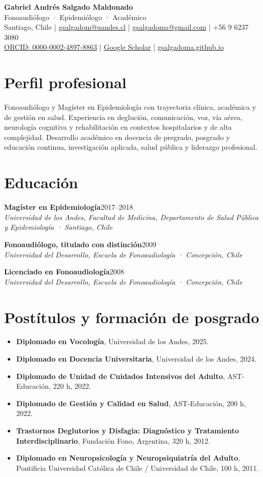 \documentclass[10pt,a4paper]{article}
\newcommand{\entry}[4]{%
\textbf{#1}\hfill {\small #2}\\
{\emph{#3}}\\[-1pt]
#4\par\vspace{4pt}}
\begin{document}
{\Huge\bfseries Gabriel Andrés Salgado Maldonado}\\[3pt]
{\large\color{textgray}Fonoaudiólogo · Epidemiólogo · Académico}\\[6pt]
Santiago, Chile \quad | \quad \href{mailto:gsalgadom@uandes.cl}{gsalgadom@uandes.cl} \quad | \quad \href{mailto:gsalgadoma@gmail.com}{gsalgadoma@gmail.com} \quad | \quad +56 9 6237 3080\\
\href{https://orcid.org/0000-0002-4897-8863}{ORCID: 0000-0002-4897-8863} \quad | \quad \href{https://scholar.google.com/citations?user=lUJ6RBoAAAAJ}{Google Scholar} \quad | \quad \href{https://gsalgadoma.github.io}{gsalgadoma.github.io}

\section*{Perfil profesional}
Fonoaudiólogo y Magíster en Epidemiología con trayectoria clínica, académica y de gestión en salud. Experiencia en deglución, comunicación, voz, vía aérea, neurología cognitiva y rehabilitación en contextos hospitalarios y de alta complejidad. Desarrollo académico en docencia de pregrado, posgrado y educación continua, investigación aplicada, salud pública y liderazgo profesional.

\section*{Educación}
\entry{Magíster en Epidemiología}{2017--2018}{Universidad de los Andes, Facultad de Medicina, Departamento de Salud Pública y Epidemiología · Santiago, Chile}{}
\entry{Fonoaudiólogo, titulado con distinción}{2009}{Universidad del Desarrollo, Escuela de Fonoaudiología · Concepción, Chile}{}
\entry{Licenciado en Fonoaudiología}{2008}{Universidad del Desarrollo, Escuela de Fonoaudiología · Concepción, Chile}{}

\section*{Postítulos y formación de posgrado}
\begin{itemize}
  \item \textbf{Diplomado en Vocología}, Universidad de los Andes, 2025.
  \item \textbf{Diplomado en Docencia Universitaria}, Universidad de los Andes, 2024.
  \item \textbf{Diplomado de Unidad de Cuidados Intensivos del Adulto}, AST-Educación, 220 h, 2022.
  \item \textbf{Diplomado de Gestión y Calidad en Salud}, AST-Educación, 200 h, 2022.
  \item \textbf{Trastornos Deglutorios y Disfagia: Diagnóstico y Tratamiento Interdisciplinario}, Fundación Fono, Argentina, 320 h, 2012.
  \item \textbf{Diplomado en Neuropsicología y Neuropsiquiatría del Adulto}, Pontificia Universidad Católica de Chile / Universidad de Chile, 100 h, 2011.
\end{itemize}
\end{document}
